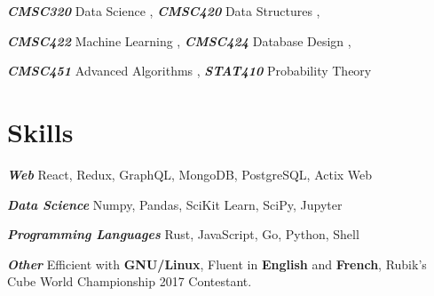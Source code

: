 \documentclass[12pt]{article}
\newcommand{\smalltitle}[2]{
   \textbf{\textit{#1}} #2

   \medskip
}
\newcommand{\course}[2]{
  {\small {\textbf{\textit{#1}}} {#2}}
}
\begin{document}
    \course{CMSC320}{Data Science}, \course{CMSC420}{Data Structures},
    \course{CMSC422}{Machine Learning}, \course{CMSC424}{Database Design},
    \course{CMSC451}{Advanced Algorithms}, \course{STAT410}{Probability Theory}

    \section{Skills}

    \smalltitle{Web}{
      React, Redux, GraphQL, MongoDB, PostgreSQL, Actix Web
    }

    \smalltitle{Data Science}{
      Numpy, Pandas, SciKit Learn, SciPy, Jupyter
    }

    \smalltitle{Programming Languages}{
      Rust, JavaScript, Go, Python, Shell
    }

    \smalltitle{Other}{
      Efficient with {\bf GNU/Linux}, Fluent in {\bf English} and {\bf French},
      Rubik's Cube World Championship 2017 Contestant.
    }
\end{document}
